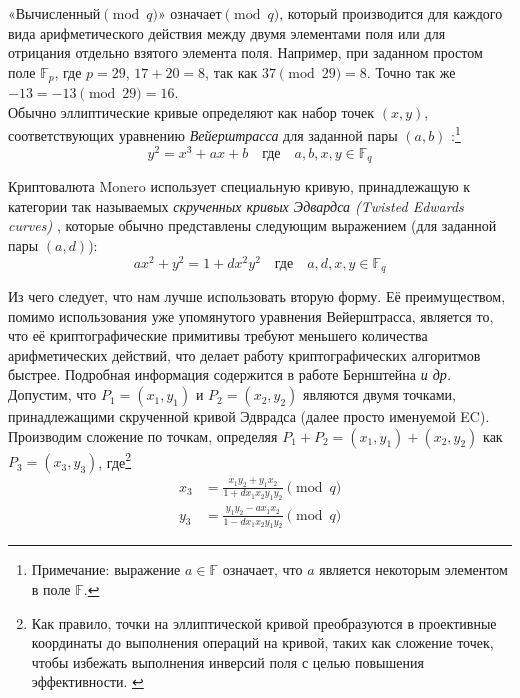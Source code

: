 «Вычисленный\( \pmod q\)» означает\( \pmod q\), который производится для каждого вида ариф\-метического действия между двумя элементами поля или для отрицания отдельно взятого элемента поля. Например, при заданном простом поле \(\mathbb{F}_p\), где $p = 29$, $17+20=8$, так как $37 \pmod{29} = 8$. Точно так же $-13 = -13 \pmod{29} = 16$.\\

Обычно эллиптические кривые определяют как набор точек \((x, y)\), соответствующих урав\-нению {\em  Вейерштрасса} для заданной пары $(a,b)$ \cite{Hankerson:2003:GEC:940321}:\footnote{\label{notation1}Примечание: выражение $a \in \mathbb{F}$ означает, что $a$ является некоторым элементом в поле $\mathbb{F}$.}\vspace{.175cm}
\[y^2 = x^3 + a x + b \quad \textrm{где} \quad a, b, x, y \in \mathbb{F}_q\]

Криптовалюта Monero использует специальную кривую, принадлежащую к категории так называемых {\em скрученных кривых Эдвардса (Twisted Edwards curves)} \cite{Bernstein2008}, которые обычно пред\-ставлены следующим выражением (для заданной пары $(a,d)$):\vspace{.175cm}
\[a x^2 + y^2 = 1 + d x^2 y^2 \quad \textrm{где} \quad a, d, x, y \in \mathbb{F}_q \]


Из чего следует, что нам лучше использовать вторую форму. Её преимуществом, помимо использования уже упомянутого уравнения Вейерштрасса, является то, что её криптогра\-фические примитивы требуют меньшего количества арифметических действий, что делает работу криптографических алгоритмов быстрее. Подробная информация содержится в рабо\-те Бернштейна \cite{Bernstein2007}  {\em и др.}\\

Допустим, что \(P_1 = (x_1, y_1)\) и \(P_2 = (x_2, y_2)\) являются двумя точками, принадлежащими скрученной кривой Эдврадса (далее просто именуемой EC). Производим сложение по точкам, определяя $P_1 + P_2 = (x_1, y_1) + (x_2, y_2)$ как $P_3 = (x_3, y_3)$, где\footnote{Как правило, точки на эллиптической кривой преобразуются в проективные координаты до выполнения операций на кривой, таких как сложение точек, чтобы избежать выполнения инверсий поля с целью повышения эффективности.  \cite{ecc-projective}}\vspace{.175cm}
\begin{align*}
x_3 & =  \frac{x_1 y_2 + y_1 x_ 2}{1 + d x_1 x_2 y_1 y_2}  \pmod{q} \\
y_3 & =  \frac{y_1 y_2 - a x_1 x_2}{1 - d x_1 x_2 y_1 y_2} \pmod{q} 
\end{align*}

